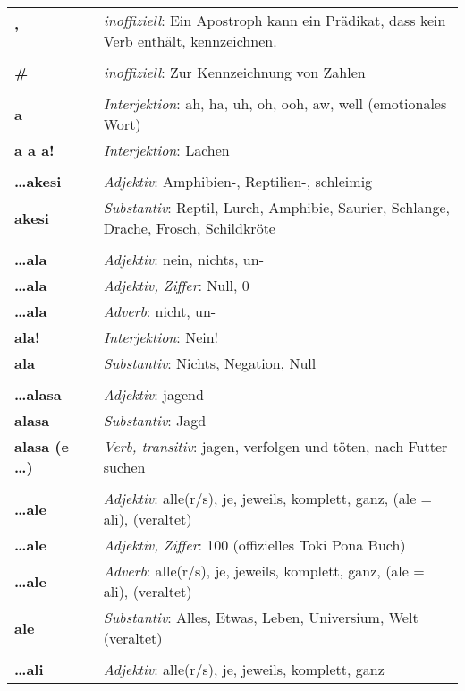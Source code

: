 \begin{supertabular}{p{2,5cm}|ll}
\textbf{'} && \textit{inoffiziell}: Ein Apostroph kann ein Prädikat, dass kein Verb enthält, kennzeichnen. \\ 
 && \\ %
\textbf{\#} && \textit{inoffiziell}: Zur Kennzeichnung von Zahlen \\ 
 && \\ %
\textbf{a} && \textit{Interjektion}: ah, ha, uh, oh, ooh, aw, well  (emotionales Wort) \\ 
\textbf{a a a!} && \textit{Interjektion}: Lachen \\ 
 && \\ %
\textbf{\dots akesi} && \textit{Adjektiv}: Amphibien-, Reptilien-, schleimig \\ 
\textbf{akesi} && \textit{Substantiv}: Reptil, Lurch, Amphibie, Saurier, Schlange, Drache, Frosch, Schildkröte \\ 
 && \\ %
\textbf{\dots ala} && \textit{Adjektiv}: nein, nichts, un- \\ 
\textbf{\dots ala} && \textit{Adjektiv, Ziffer}: Null, 0 \\ 
\textbf{\dots ala} && \textit{Adverb}: nicht, un- \\ 
\textbf{ala!} && \textit{Interjektion}: Nein! \\ 
\textbf{ala} && \textit{Substantiv}: Nichts, Negation, Null \\ 
 && \\ %
\textbf{\dots alasa} && \textit{Adjektiv}: jagend \\ 
\textbf{alasa} && \textit{Substantiv}: Jagd \\ 
\textbf{alasa (e \dots)} && \textit{Verb, transitiv}: jagen, verfolgen und töten, nach Futter suchen \\ 
 && \\ %
\textbf{\dots ale} && \textit{Adjektiv}: alle(r/s), je, jeweils, komplett, ganz, (ale = ali), (veraltet) \\ 
\textbf{\dots ale} && \textit{Adjektiv, Ziffer}: 100 (offizielles Toki Pona Buch) \\ 
\textbf{\dots ale} && \textit{Adverb}: alle(r/s), je, jeweils, komplett, ganz, (ale = ali), (veraltet) \\ 
\textbf{ale} && \textit{Substantiv}:  Alles, Etwas, Leben, Universium, Welt (veraltet) \\ 
 && \\ %
\textbf{\dots ali} && \textit{Adjektiv}: alle(r/s), je, jeweils, komplett, ganz \\ 

\end{supertabular}
